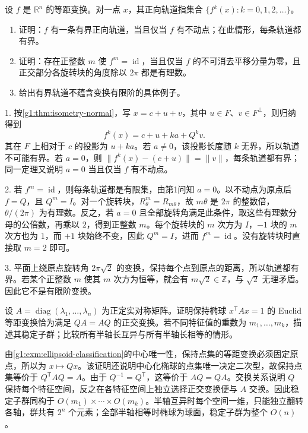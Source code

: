 \begin{exercise}
	\label{g1:ex:isometry-bounded-orbit}
	设 \(f\) 是 \(\mathbb R^n\) 的等距变换。对一点 \(x\)，其正向轨道指集合 \(\{f^k(x):k=0,1,2,\ldots\}\)。
	\begin{enumerate}
		\item 证明：\(f\) 有一条有界正向轨道，当且仅当 \(f\) 有不动点；在此情形，每条轨道都有界。
		\item 证明：存在正整数 \(m\) 使 \(f^m=\operatorname{id}\)，当且仅当 \(f\) 的不可消去平移分量为零，且正交部分各旋转块的角度除以 \(2\pi\) 都是有理数。
		\item 给出有界轨道不蕴含变换有限阶的具体例子。
	\end{enumerate}
\end{exercise}
\begin{solution}
	1. 按\cref{g1:thm:isometry-normal}，写 \(x=c+u+v\)，其中 \(u\in F\)、\(v\in F^\perp\)，则归纳得到
	\[
		f^k(x)=c+u+ka+Q^kv.
	\]
	其在 \(F\) 上相对于 \(c\) 的投影为 \(u+ka\)。若 \(a\ne0\)，该投影长度随 \(k\) 无界，所以轨道不可能有界。若 \(a=0\)，则 \(\lVert f^k(x)-(c+u)\rVert=\lVert v\rVert\)，每条轨道都有界；同一定理又说明 \(a=0\) 当且仅当 \(f\) 有不动点。

	2. 若 \(f^m=\operatorname{id}\)，则每条轨道都是有限集，由第1问知 \(a=0\)。以不动点为原点后 \(f=Q\)，且 \(Q^m=I\)。对一个旋转块，\(R_\theta^m=R_{m\theta}\)，故 \(m\theta\) 是 \(2\pi\) 的整数倍，\(\theta/(2\pi)\) 为有理数。反之，若 \(a=0\) 且全部旋转角满足此条件，取这些有理数分母的公倍数，再乘以 \(2\)，得到正整数 \(m\)。每个旋转块的 \(m\) 次方为 \(I\)，\(-1\) 块的 \(m\) 次方也为 \(1\)，而 \(+1\) 块始终不变，因此 \(Q^m=I\)，进而 \(f^m=\operatorname{id}\)。没有旋转块时直接取 \(m=2\) 即可。

	3. 平面上绕原点旋转角 \(2\pi\sqrt2\) 的变换，保持每个点到原点的距离，所以轨道都有界。若某个正整数 \(m\) 使其 \(m\) 次方为恒等，就会有 \(m\sqrt2\in\mathbb Z\)，与 \(\sqrt2\) 无理矛盾。因此它不是有限阶变换。
\end{solution}


\begin{exercise}\label{g1:ex:ellipsoid-stabilizer}
	设 \(A=\operatorname{diag}(\lambda_1,\ldots,\lambda_n)\) 为正定实对称矩阵。证明保持椭球 \(x^{\mathsf T}Ax=1\) 的 Euclid 等距变换恰为满足 \(QA=AQ\) 的正交变换。若不同特征值的重数为 \(m_1,\ldots,m_k\)，描述其稳定子群；比较所有半轴长互异与所有半轴长相等的情形。
\end{exercise}
\begin{solution}
	由\cref{g1:exm:ellipsoid-classification}的中心唯一性，保持点集的等距变换必须固定原点，所以为 \(x\mapsto Qx\)。该证明还说明中心化椭球的点集唯一决定二次型，故保持点集等价于 \(Q^{\mathsf T}AQ=A\)。由于 \(Q^{-1}=Q^{\mathsf T}\)，这等价于 \(AQ=QA\)。交换关系说明 \(Q\) 保持每个特征空间，反之在各特征空间上独立选择正交变换便与 \(A\) 交换。因此稳定子群同构于 \(O(m_1)\times\cdots\times O(m_k)\)。半轴互异时每个空间一维，只能独立翻转各轴，群共有 \(2^n\) 个元素；全部半轴相等时椭球为球面，稳定子群为整个 \(O(n)\)。
\end{solution}

